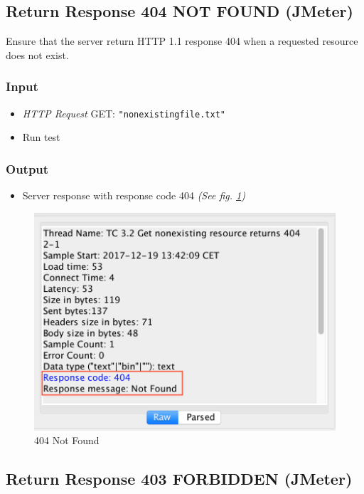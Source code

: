 \documentclass[a4paper, 12pt]{article}
\begin{document}
\subsection{Return Response 404 NOT FOUND (JMeter)}

Ensure that the server return HTTP 1.1 response 404 when a requested resource does not exist.

\subsubsection{Input}
\begin{itemize}
\item \textit{HTTP Request} GET: \texttt{"nonexistingfile.txt"}
\item Run test
\end{itemize}

\subsubsection{Output}
\begin{itemize}
\item Server response with response code 404 \textit{(See fig. \ref{TC3.2})}
\end{itemize}

\begin{figure}[H]
\centering
\includegraphics[scale=0.7]{output_clarification/404NOTFOUND.png} 
\caption{404 Not Found}
\label{TC3.2}
\end{figure}


\subsection{Return Response 403 FORBIDDEN (JMeter)}
\end{document}

